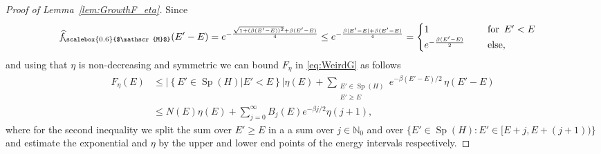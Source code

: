 \documentclass[11pt]{amsart}
\newcommand{\nn}{\nonumber}
\newcommand{\1}{\mathbbm{1}}
\newcommand{\N}{\mathbb{N}}
\newcommand{\E}{\mathbb{E}}
\newcommand{\spec}{\operatorname{Sp}}
\newcommand{\hatfM}{\widehat{f}_{\!\scalebox{0.6}{$\mathscr{M}$}}
}
\theoremstyle{plain}
\theoremstyle{definition}
\theoremstyle{remark}
\numberwithin{equation}{section}
\begin{document}
\begin{proof}[Proof of Lemma~\ref{lem:GrowthF_eta}]
Since 
\begin{align*}
    \hatfM (E'-E) &= e^{ -\frac{\sqrt{1 + (\beta (E'-E))^2} + \beta (E'-E)}{4}} \le e^{-\frac{\beta|E'-E| + \beta(E'-E)}{4}} =
    \begin{cases} 1 \quad&\text{ for }\, E'< E\\
e^{-\frac{\beta(E'-E)}{2}} \quad &\text{ else},
\end{cases} 
\end{align*}
 and using that $\eta$ is non-decreasing and symmetric we can bound $F_\eta$ in \eqref{eq:WeirdG} as follows
\begin{align}
\label{eq:GUpperbound}
    \nn F_\eta(E) &\le \left|\left\{E'\in\spec(H)\big| E'< E\right\}\right|\eta(E) + \sum_{\substack{E'\in\spec(H)\\E'\ge E}} e^{-\beta(E'-E)/2}\,\eta(E'-E)\\&\le 
      N(E) \eta(E) + \sum_{j=0}^{\infty} B_j(E) e^{-\beta j/2} \eta(j+1),
\end{align}
where for the second inequality we split the sum over $E'\ge E$ in a a sum over $j\in\N_0$ and over $\{E'\in\spec(H):E'\in[E+j,E+(j+1))\}$ and estimate the exponential and $\eta$ by the upper and lower end points of the energy intervals respectively.


\end{proof}
\end{document}
